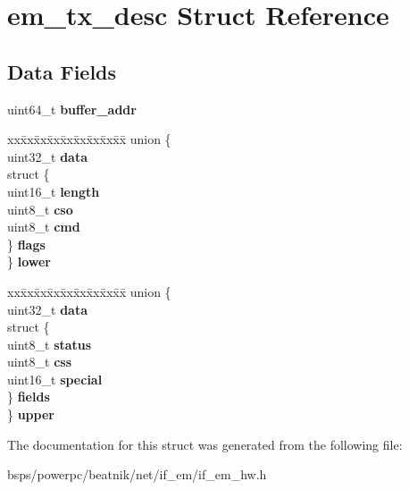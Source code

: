 \hypertarget{structem__tx__desc}{}\section{em\+\_\+tx\+\_\+desc Struct Reference}
\label{structem__tx__desc}
\subsection*{Data Fields}
\begin{DoxyCompactItemize}
\item 
\mbox{\label{structem__tx__desc_a726e6830f88bfdc3c865cc425e1930ae}} 
uint64\+\_\+t {\bfseries buffer\+\_\+addr}
\item 
\mbox{\label{structem__tx__desc_a47ae342017cb4805bcb00d2ec7a7bb98}} 
\begin{tabbing}
xx\=xx\=xx\=xx\=xx\=xx\=xx\=xx\=xx\=\kill
union \{\\
\>uint32\_t {\bfseries data}\\
\>struct \{\\
\>\>uint16\_t {\bfseries length}\\
\>\>uint8\_t {\bfseries cso}\\
\>\>uint8\_t {\bfseries cmd}\\
\>\} {\bfseries flags}\\
\} {\bfseries lower}\\

\end{tabbing}\item 
\mbox{\label{structem__tx__desc_a2cda9062c8c66c660537c19924f996cb}} 
\begin{tabbing}
xx\=xx\=xx\=xx\=xx\=xx\=xx\=xx\=xx\=\kill
union \{\\
\>uint32\_t {\bfseries data}\\
\>struct \{\\
\>\>uint8\_t {\bfseries status}\\
\>\>uint8\_t {\bfseries css}\\
\>\>uint16\_t {\bfseries special}\\
\>\} {\bfseries fields}\\
\} {\bfseries upper}\\

\end{tabbing}\end{DoxyCompactItemize}


The documentation for this struct was generated from the following file\+:\begin{DoxyCompactItemize}
\item 
bsps/powerpc/beatnik/net/if\+\_\+em/if\+\_\+em\+\_\+hw.\+h\end{DoxyCompactItemize}
